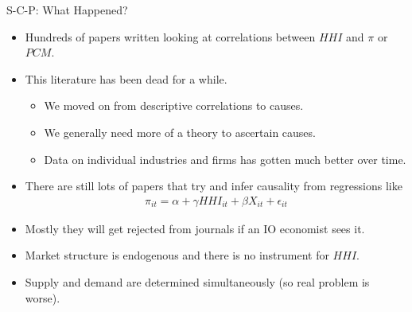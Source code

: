 \documentclass[xcolor=pdftex,dvipsnames,table,mathserif,aspectratio=169]{beamer}
\begin{document}
\begin{frame}{S-C-P: What Happened?}

\begin{itemize}
\item Hundreds of papers written looking at correlations between $HHI$ and $\pi$ or $PCM$.
\item This literature has been dead for a while.
\begin{itemize}
\item We moved on from descriptive correlations to causes.
\item We generally need more of a theory to ascertain causes.
\item Data on individual industries and firms has gotten much better over time.
\end{itemize}
\item There are still lots of papers that try and infer causality from regressions like 
\begin{eqnarray*}
\pi_{it} = \alpha + \gamma HHI_{it} + \beta X_{it} + \epsilon_{it} 
\end{eqnarray*}
\item Mostly they will get rejected from journals if an IO economist sees it.
\item Market structure is \alert{endogenous} and there is no instrument for $HHI$.
\item Supply and demand are determined \alert{simultaneously} (so real problem is worse).
\end{itemize}
\end{frame}
\end{document}
